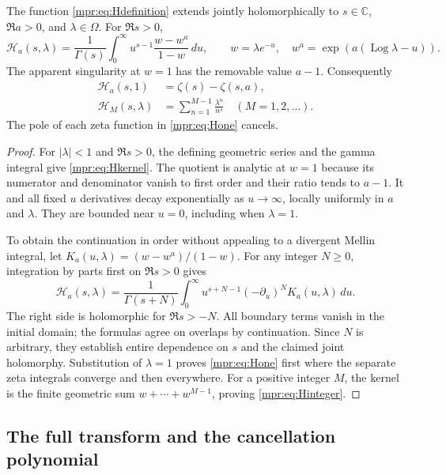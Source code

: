 \begin{lemma}\label{mpr:lem:H}
The function \eqref{mpr:eq:Hdefinition} extends jointly holomorphically
to $s\in\mathbb C$, $\Re a>0$, and $\lambda\in\Omega$.  For $\Re s>0$,
\begin{equation}\label{mpr:eq:Hkernel}
 \mathcal H_a(s,\lambda)
 =\frac1{\Gamma(s)}\int_0^\infty u^{s-1}
       \frac{w-w^a}{1-w}\,du,
 \qquad w=\lambda e^{-u},\quad
 w^a=\exp(a(\operatorname{Log}\lambda-u)).
\end{equation}
The apparent singularity at $w=1$ has the removable value $a-1$.
Consequently
\begin{align}
 \mathcal H_a(s,1)&=\zeta(s)-\zeta(s,a),
       \label{mpr:eq:Hone}\\
 \mathcal H_M(s,\lambda)&=\sum_{n=1}^{M-1}\frac{\lambda^n}{n^s}
       \quad(M=1,2,\ldots).
       \label{mpr:eq:Hinteger}
\end{align}
The pole of each zeta function in \eqref{mpr:eq:Hone} cancels.
\end{lemma}

\begin{proof}
For $|\lambda|<1$ and $\Re s>0$, the defining geometric series and the
gamma integral give \eqref{mpr:eq:Hkernel}.  The quotient is analytic at
$w=1$ because its numerator and denominator vanish to first order and
their ratio tends to $a-1$.  It and all fixed $u$ derivatives decay
exponentially as $u\to\infty$, locally uniformly in $a$ and $\lambda$.
They are bounded near $u=0$, including when $\lambda=1$.

To obtain the continuation in order without appealing to a divergent
Mellin integral, let $K_a(u,\lambda)=(w-w^a)/(1-w)$.  For any integer
$N\ge0$, integration by parts first on $\Re s>0$ gives
\[
 \mathcal H_a(s,\lambda)
 =\frac1{\Gamma(s+N)}\int_0^\infty
        u^{s+N-1}(-\partial_u)^N K_a(u,\lambda)\,du.
\]
The right side is holomorphic for $\Re s>-N$.  All boundary terms vanish
in the initial domain; the formulas agree on overlaps by continuation.
Since $N$ is arbitrary, they establish entire dependence on $s$ and the
claimed joint holomorphy.  Substitution of $\lambda=1$ proves
\eqref{mpr:eq:Hone} first where the separate zeta integrals converge and
then everywhere.  For a positive integer $M$, the kernel is the finite
geometric sum $w+\cdots+w^{M-1}$, proving
\eqref{mpr:eq:Hinteger}.
\end{proof}

\subsection{The full transform and the cancellation polynomial}

